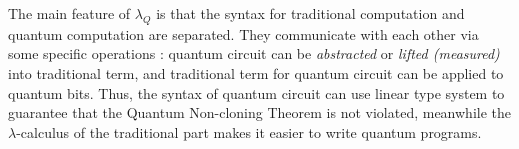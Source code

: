 The main feature of $\lambda_Q$ is that the syntax for traditional computation and quantum computation are separated.
They communicate with each other via some specific operations : quantum circuit can be \textit{abstracted} or \textit{lifted (measured)} into traditional term, and traditional term for quantum circuit can be applied to quantum bits.
Thus, the syntax of quantum circuit can use linear type system to guarantee that the Quantum Non-cloning Theorem is not violated, meanwhile the $\lambda$-calculus of the traditional part makes it easier to write quantum programs.